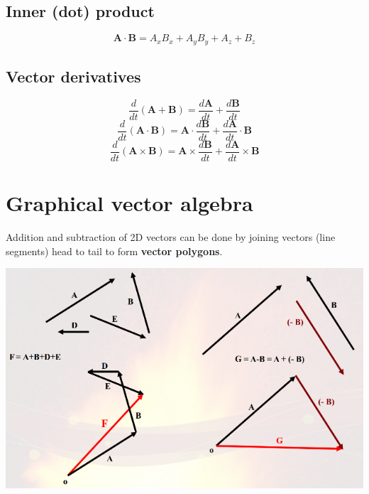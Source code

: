 \documentclass[11pt]{article}
\begin{document}
\subsection{Inner (dot) product}
\label{sec:org3183168}
\[\boldsymbol{A} \cdot \boldsymbol{B} = A_x B_x + A_y B_y + A_z + B_z\]
\subsection{Vector derivatives}
\label{sec:orga74b4ec}
\[\frac{d}{dt} (\boldsymbol{A} + \boldsymbol{B}) = \frac{d \boldsymbol{A}}{dt} + \frac{d \boldsymbol{B}}{dt}\]
\[\frac{d}{dt} (\boldsymbol{A} \cdot \boldsymbol{B}) = \boldsymbol{A} \cdot \frac{d \boldsymbol{B}}{dt} + \frac{d \boldsymbol{A}}{dt} \cdot \boldsymbol{B}\]
\[\frac{d}{dt} (\boldsymbol{A} \times \boldsymbol{B}) = \boldsymbol{A} \times \frac{d \boldsymbol{B}}{dt} + \frac{d \boldsymbol{A}}{dt} \times \boldsymbol{B}\]
\section{Graphical vector algebra}
\label{sec:orga0322f4}
Addition and subtraction of 2D vectors can be done by joining vectors (line segments) head to tail to form \textbf{vector polygons}.

\begin{center}
\includegraphics[width=.9\linewidth]{./images/graphical-vector-algebra.png}
\end{center}

 \newpage
\end{document}
